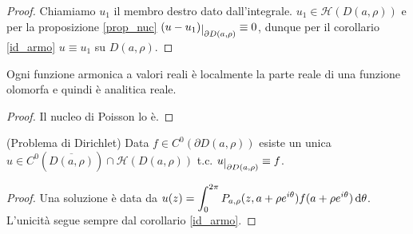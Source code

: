 \begin{proof}
  Chiamiamo $u_1$ il membro destro dato dall'integrale. $u_1 \in \mathcal{H}(D(a,\rho))$ e per la proposizione \ref{prop_nuc} $(u-u_1)\restrict{\partial D(a, \rho)} \equiv 0$, dunque per il corollario \ref{id_armo} $u \equiv u_1$ su $D(a, \rho)$.
\end{proof}

\begin{cor}
  Ogni funzione armonica a valori reali è localmente la parte reale di una funzione olomorfa e quindi è analitica reale.
\end{cor}

\begin{proof}
  Il nucleo di Poisson lo è.
\end{proof}

\begin{cor}
  (Problema di Dirichlet) Data $f \in C^0(\partial D(a,\rho))$ esiste un unica $u \in C^0(\overline{D(a,\rho)}) \cap \mathcal{H}(D(a,\rho))$ t.c. $u\restrict{\partial D(a,\rho)} \equiv f$.
\end{cor}

\begin{proof}
  Una soluzione è data da $\displaystyle u(z)=\int_0^{2\pi} P_{a,\rho}(z,a+\rho e^{i\theta})f(a+\rho e^{i\theta})\mathop{}\!\mathrm{d}\theta$. L'unicità segue sempre dal corollario \ref{id_armo}.
\end{proof}
